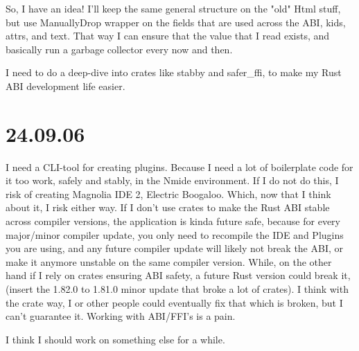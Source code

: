 So, I have an idea! I'll keep the same general structure on the "old" Html stuff, but use
ManuallyDrop wrapper on the fields that are used across the ABI, kids, attrs, and text. That way I
can ensure that the value that I read exists, and basically run a garbage collector every now and
then.

I need to do a deep-dive into crates like stabby and safer_ffi, to make my Rust ABI development life
easier.


\section{24.09.06}

I need a CLI-tool for creating plugins. Because I need a lot of boilerplate code for it too work,
safely and stably, in the Nmide environment. If I do not do this, I risk of creating Magnolia IDE
2, Electric Boogaloo. Which, now that I think about it, I risk either way. If I don't use crates to
make the Rust ABI stable across compiler versions, the application is kinda future safe, because for
every major/minor compiler update, you only need to recompile the IDE and Plugins you are using, and
any future compiler update will likely not break the ABI, or make it anymore unstable on the same
compiler version. While, on the other hand if I rely on crates ensuring ABI safety, a future Rust
version could break it, (insert the 1.82.0 to 1.81.0 minor update that broke a lot of crates). I
think with the crate way, I or other people could eventually fix that which is broken, but I can't
guarantee it. Working with ABI/FFI's is a pain.

I think I should work on something else for a while.
